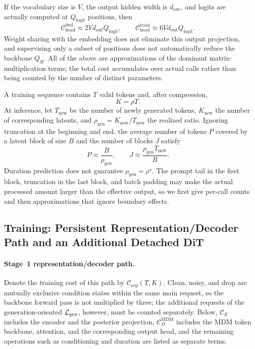 If the vocabulary size is $V$, the output hidden width is $d_{\mathrm{out}}$, and logits are actually computed at $Q_{\mathrm{logit}}$ positions, then
\begin{equation}
    \mathcal C_{\mathrm{head}}^{\mathrm{fwd}}
    \approx 2Vd_{\mathrm{out}}Q_{\mathrm{logit}},
    \qquad
    \mathcal C_{\mathrm{head}}^{\mathrm{train}}
    \approx 6Vd_{\mathrm{out}}Q_{\mathrm{logit}}.
    \label{eq:app-cost-output-head}
\end{equation}
Weight sharing with the embedding does not eliminate this output projection, and supervising only a subset of positions does not automatically reduce the backbone $Q_R$. All of the above are approximations of the dominant matrix-multiplication terms; the total cost accumulates over actual calls rather than being counted by the number of distinct parameters.

A training sequence contains $T$ valid tokens and, after compression,
\begin{equation}
    K=\rho T.
    \label{eq:app-cost-compression}
\end{equation}
At inference, let $T_{\mathrm{new}}$ be the number of newly generated tokens, $K_{\mathrm{new}}$ the number of corresponding latents, and $\rho_{\mathrm{gen}}=K_{\mathrm{new}}/T_{\mathrm{new}}$ the realized ratio. Ignoring truncation at the beginning and end, the average number of tokens $P$ covered by a latent block of size $B$ and the number of blocks $J$ satisfy
\begin{equation}
    P\approx\frac{B}{\rho_{\mathrm{gen}}},
    \qquad
    J\approx\frac{\rho_{\mathrm{gen}}T_{\mathrm{new}}}{B}.
    \label{eq:app-cost-token-per-block}
\end{equation}
Duration prediction does not guarantee $\rho_{\mathrm{gen}}=\rho^\star$. The prompt tail in the first block, truncation in the last block, and batch padding may make the actual processed amount larger than the effective output, so we first give per-call counts and then approximations that ignore boundary effects.

\subsection{Training: Persistent Representation/Decoder Path and an Additional Detached DiT}
\label{app:ar-comparison}

\paragraph{Stage~1 representation/decoder path.}
Denote the training cost of this path by $\mathcal C_{\mathrm{rep}}(T,K)$. Clean, noisy, and drop are mutually exclusive condition states within the same main request, so the backbone forward pass is not multiplied by three; the additional requests of the generation-oriented $\mathcal{L}_{\mathrm{gen}}$, however, must be counted separately. Below, $\mathcal C_E$ includes the encoder and the posterior projection, $\mathcal C_D^{\mathrm{MDM}}$ includes the MDM token backbone, attention, and the corresponding output head, and the remaining operations such as conditioning and duration are listed as separate terms.

